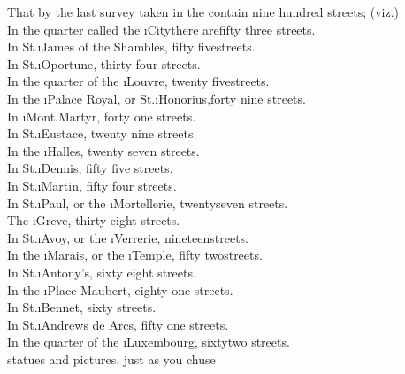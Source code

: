 \documentclass[twoside]{article}
\begin{document}
That by the last survey taken in the\break
{} 
contain nine hundred streets; (viz.)\\[2pt]
In the quarter called the \i{City}\tsk there are\bnq fifty three streets.\\
In St.\@ \i{James} of the Shambles, fifty five\bnq streets.\\
In St.\@ \i{Oportune}, thirty four streets.\\
In the quarter of the \i{Louvre}, twenty five\bnq streets.\\
In the \i{Palace Royal}, or St.\@ \i{Honorius},\bnq forty nine streets.\\
In \i{Mont.\@ Martyr}, forty one streets.\\
In St.\@ \i{Eustace}, twenty nine streets.\\
\newpage\noindent
In the \i{Halles}, twenty seven streets.\\
In St.\@ \i{Dennis}, fifty five streets.\\
In St.\@ \i{Martin}, fifty four streets.\\
In St.\@ \i{Paul}, or the \i{Mortellerie}, twenty\bnq seven streets.\\
The \i{Greve}, thirty eight streets.\\
In St.\@ \i{Avoy}, or the \i{Verrerie}, nineteen\bnq streets.\\
In the \i{Marais}, or the \i{Temple}, fifty two\bnq streets.\\
In St.\@ \i{Antony}’s, sixty eight streets.\\
In the \i{Place Maubert}, eighty one streets.\\
In St.\@ \i{Bennet}, sixty streets.\\
In St.\@ \i{Andrews de Arcs}, fifty one streets.\\
In the quarter of the \i{Luxembourg}, sixty\bnq two streets.\\[2pt]
statues and pictures, just as you chuse\tsk
\end{document}
